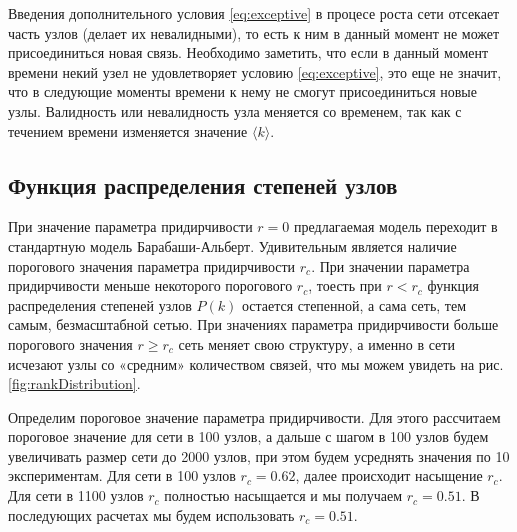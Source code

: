 \documentclass[10pt,aps,pra]{revtex4-1}
\begin{document}
Введения дополнительного условия \eqref{eq:exceptive} в процесе роста сети отсекает часть узлов (делает их невалидными), то есть к ним в данный момент не может присоединиться новая связь. Необходимо заметить, что если в данный момент времени некий узел не удовлетворяет условию \eqref{eq:exceptive}, это еще не значит, что в следующие моменты времени к нему не смогут присоединиться новые узлы. Валидность или невалидность узла меняется со временем, так как с течением времени изменяется значение $\langle k \rangle$.

\subsection{Функция распределения степеней узлов}
При значение параметра придирчивости $r=0$ предлагаемая модель переходит в стандартную модель Барабаши-Альберт. Удивительным является наличие порогового значения параметра придирчивости $r_c$. При значении параметра придирчивости меньше некоторого порогового $r_c$, тоесть при $r<r_c$ функция распределения степеней узлов $P(k)$ остается степенной, а сама сеть, тем самым, безмасштабной сетью. При значениях параметра придирчивости больше порогового значения $r \geq r_c$ сеть меняет свою структуру, а именно в сети исчезают узлы со «средним» количеством связей, что мы можем увидеть на рис. \ref{fig:rankDistribution}. 

Определим пороговое значение параметра придирчивости. Для этого рассчитаем пороговое значение для сети в 100 узлов, а дальше с шагом в 100 узлов будем увеличивать размер сети до 2000 узлов, при этом будем усреднять значения по 10 экспериментам. Для сети в 100 узлов $r_c=0.62$, далее происходит насыщение $r_c$. Для сети в 1100 узлов $r_c$ полностью насыщается и мы получаем $r_c=0.51$. В последующих расчетах мы будем использовать $r_c=0.51$.
\end{document}
